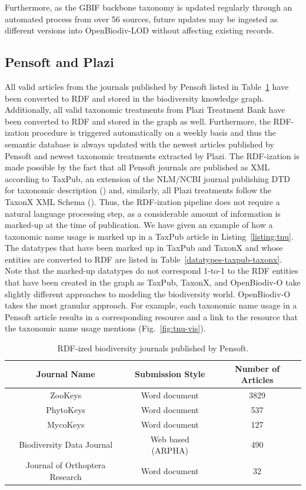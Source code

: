 Furthermore, as the GBIF backbone taxonomy is updated regularly through an automated process from over 56 sources, future updates may be ingested as different versions into OpenBiodiv-LOD without affecting existing records.

\subsection{Pensoft and Plazi}

All valid articles from the journals published by Pensoft listed in Table~\ref{rdf-pensoft-journals} have been converted to RDF and stored in the biodiversity knowledge graph. Additionally, all valid taxonomic treatments from Plazi Treatment Bank have been converted to RDF and stored in the graph as well. Furthermore, the RDF-ization procedure is triggered automatically on a weekly basis and thus the semantic database is always updated with the newest articles published by Pensoft and newest taxonomic treatments extracted by Plazi. The RDF-ization is made possible by the fact that all Pensoft journals are published as XML according to TaxPub, an extension of the NLM/NCBI journal publishing DTD for taxonomic description (\cite{catapano_taxpub:_2010}) and, similarly, all Plazi treatments follow the TaxonX XML Schema (\cite{penev_xml_2011}). Thus, the RDF-ization pipeline does not require a natural language processing step, as a considerable amount of information is marked-up at the time of publication. We have given an example of how a taxonomic name usage is marked up in a TaxPub article in Listing~\ref{listing:tnu}. The datatypes that have been marked up in TaxPub and TaxonX and whose entities are converted to RDF are listed in Table~\ref{datatypes-taxpub-taxonx}. Note that the marked-up datatypes do not correspond 1-to-1 to the RDF entities that have been created in the graph as TaxPub, TaxonX, and OpenBiodiv-O take slightly different approaches to modeling the biodiversity world. OpenBiodiv-O takes the most granular approach. For example, each taxonomic name usage in a Pensoft article results in a corresponding  resource and a link to the  resource that the taxonomic name usage mentions (Fig.~\ref{fig:tnu-vis}).



\begin{table}[h!]
\caption{RDF-ized biodiversity journals published by Pensoft.}
      \begin{tabular}{ccc}
        \hline
          Journal Name             & Submission Style & Number of Articles\\  \hline
          ZooKeys                 & Word document & 3829\\
          PhytoKeys               & Word document & 537\\
          MycoKeys                & Word document & 127\\
          Biodiversity Data Journal & Web based (ARPHA) & 490\\
          Journal of Orthoptera Research & Word document & 32
      \end{tabular}
      \label{rdf-pensoft-journals}
\end{table}

